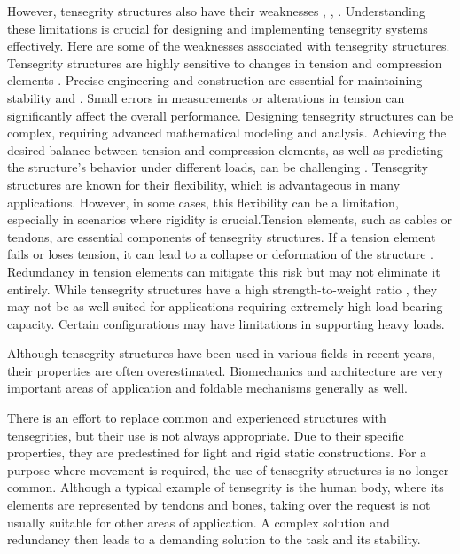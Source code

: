\documentclass{article}
\begin{document}
However, tensegrity structures also have their weaknesses \cite{Ref_Skelton_2001_introduction}, \cite{Ref_Hajzman_OWN_planning_method}, \cite{Ref_Krivosej_OWN_tensegrity_based_robots}. Understanding these limitations is crucial for designing and implementing tensegrity systems effectively. Here are some of the weaknesses associated with tensegrity structures. Tensegrity structures are highly sensitive to changes in tension and compression elements \cite{Ref_Krivosej_OWN_tensegrity_based_robots}. Precise engineering and construction are essential for maintaining stability \cite{Ref_Hajzman_OWN_planning_method} and \cite{Ref_Krivosej_OWN_tensegrity_based_robots}. Small errors in measurements or alterations in tension can significantly affect the overall performance. Designing tensegrity structures can be complex, requiring advanced mathematical modeling and analysis. Achieving the desired balance between tension and compression elements, as well as predicting the structure's behavior under different loads, can be challenging \cite{Ref_Krivosej_OWN_tensegrity_based_robots}. Tensegrity structures are known for their flexibility, which is advantageous in many applications. However, in some cases, this flexibility can be a limitation, especially in scenarios where rigidity is crucial.Tension elements, such as cables or tendons, are essential components of tensegrity structures. If a tension element fails or loses tension, it can lead to a collapse or deformation of the structure \cite{Ref_Skelton_2001_introduction}. Redundancy in tension elements can mitigate this risk but may not eliminate it entirely. While tensegrity structures have a high strength-to-weight ratio \cite{Ref_Krivosej_OWN_tensegrity_based_robots}, they may not be as well-suited for applications requiring extremely high load-bearing capacity. Certain configurations may have limitations in supporting heavy loads.

Although tensegrity structures have been used in various fields in recent years, their properties are often overestimated. Biomechanics and architecture are very important areas of application and foldable mechanisms generally as well.

There is an effort to replace common and experienced structures with tensegrities, but their use is not always appropriate. Due to their specific properties, they are predestined for light and rigid static constructions. For a purpose where movement is required, the use of tensegrity structures is no longer common. Although a typical example of tensegrity is the human body, where its elements are represented by tendons and bones, taking over the request is not usually suitable for other areas of application. A complex solution and redundancy then leads to a demanding solution to the task and its stability.
\end{document}
